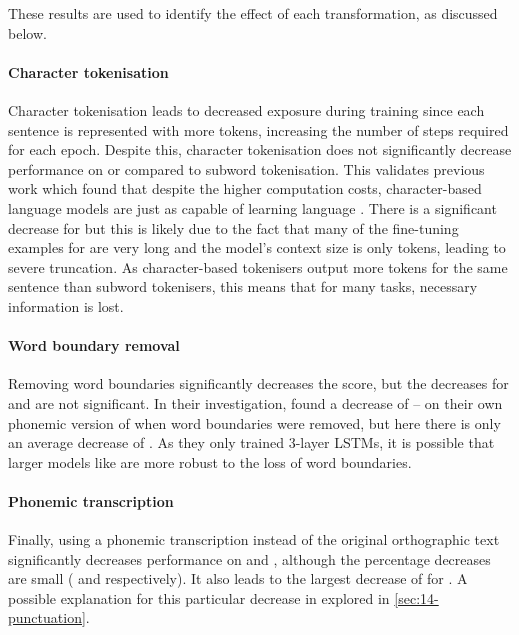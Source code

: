 These results are used to identify the effect of each transformation, as discussed below.

\paragraph{Character tokenisation} Character tokenisation leads to decreased exposure during training since each sentence is represented with more tokens, increasing the number of steps required for each epoch. Despite this, character tokenisation does not significantly decrease performance on \blimp or \blimpsupp compared to subword tokenisation. This validates previous work which found that despite the higher computation costs, character-based language models are just as capable of learning language \citep{al-rfou_character-level_2019, hahn-baroni-2019-tabula}. There is a significant decrease for \glue but this is likely due to the fact that many of the fine-tuning examples for \glue are very long and the model's context size is only  tokens, leading to severe truncation. As character-based tokenisers output more tokens for the same sentence than \bpe subword tokenisers, this means that for many \glue tasks, necessary information is lost.

\paragraph{Word boundary removal} Removing word boundaries significantly decreases the \blimp score, but the decreases for \blimpsupp and \glue are not significant. In their investigation, \citet{nguyen-2022-word-boundaries} found a decrease of -- on their own phonemic version of \blimp when word boundaries were removed, but here there is only an average decrease of . As they only trained 3-layer LSTMs, it is possible that larger models like \gpt are more robust to the loss of word boundaries.

\paragraph{Phonemic transcription} Finally, using a phonemic transcription instead of the original orthographic text significantly decreases performance on \blimp and \glue, although the percentage decreases are small ( and  respectively). It also leads to the largest decrease of  for \blimpsupp. A possible explanation for this particular decrease in explored in \cref{sec:14-punctuation}.

